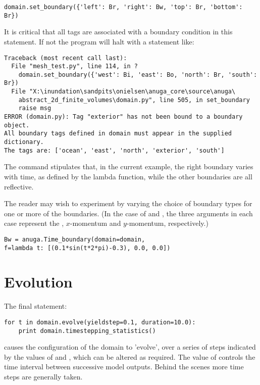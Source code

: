 \documentclass{manual}
\begin{document}
\begin{verbatim}
domain.set_boundary({'left': Br, 'right': Bw, 'top': Br, 'bottom': Br})
\end{verbatim}

It is critical that all tags are associated with a boundary condition in this statement.
If not the program will halt with a statement like:

\begin{verbatim}
Traceback (most recent call last):
  File "mesh_test.py", line 114, in ?
    domain.set_boundary({'west': Bi, 'east': Bo, 'north': Br, 'south': Br})
  File "X:\inundation\sandpits\onielsen\anuga_core\source\anuga\
    abstract_2d_finite_volumes\domain.py", line 505, in set_boundary
    raise msg
ERROR (domain.py): Tag "exterior" has not been bound to a boundary object.
All boundary tags defined in domain must appear in the supplied dictionary.
The tags are: ['ocean', 'east', 'north', 'exterior', 'south']
\end{verbatim}

The command  stipulates that, in the current example, the right
boundary varies with time, as defined by the lambda function, while the other
boundaries are all reflective.

The reader may wish to experiment by varying the choice of boundary
types for one or more of the boundaries. (In the case of \code{Bd}
and \code{Bw}, the three arguments in each case represent the
, $x$-momentum and $y$-momentum, respectively.)

\begin{verbatim}
Bw = anuga.Time_boundary(domain=domain,
f=lambda t: [(0.1*sin(t*2*pi)-0.3), 0.0, 0.0])
\end{verbatim}

\section{Evolution}

The final statement:

\begin{verbatim}
for t in domain.evolve(yieldstep=0.1, duration=10.0):
    print domain.timestepping_statistics()
\end{verbatim}

causes the configuration of the domain to 'evolve', over a series of
steps indicated by the values of  and
, which can be altered as required.  The value of
\code{yieldstep} controls the time interval between successive model
outputs.  Behind the scenes more time steps are generally taken.
\end{document}
